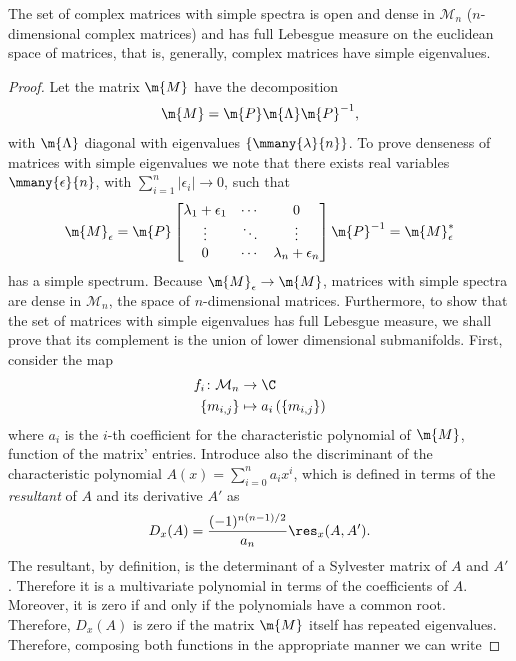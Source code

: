 \begin{proposicao} \label{Prop: simple}
	The set of complex matrices with simple spectra is open and dense in $\mathcal{M}_n$ ($n$-dimensional complex matrices) and has full Lebesgue measure on the euclidean space of matrices, that is, generally, complex matrices have simple eigenvalues.
\end{proposicao}
\begin{proof}
	Let the matrix $\m{M}$ have the decomposition
	\begin{equation}
		\m{M} = \m{P} \m{\Lambda} \m{P}^{-1},
	\end{equation}
	with $\m{\Lambda}$ diagonal with eigenvalues $\{\mmany{\lambda}{n}\}$. To prove denseness of matrices with simple eigenvalues we note that there exists real variables $\mmany{\epsilon}{n}$, with $\sum_{i=1}^n |\epsilon_i| \rightarrow 0$, such that 
	\begin{equation}
		\m{M}_\epsilon = \m{P}
		\begin{bmatrix}
			\lambda_1 + \epsilon_1 & \cdots & 0 \\
			\vdots & \ddots & \vdots \\
			0 & \cdots & \lambda_n + \epsilon_n \\
		\end{bmatrix}
		\m{P}^{-1} = \m{M}^*_\epsilon
	\end{equation}
	has a simple spectrum. Because $\m{M}_\epsilon \rightarrow \m{M}$, matrices with simple spectra are dense in $\mathcal{M}_n$, the space of $n$-dimensional matrices. Furthermore, to show that the set of matrices with simple eigenvalues has full Lebesgue measure, we shall prove that its complement is the union of lower dimensional submanifolds. First, consider the map
	\begin{align}
		f_i \colon  \mathcal{M}_n & \rightarrow \C \\
		\left\{ m_{i,j} \right\} & \mapsto a_i\left(\left\{ m_{i,j} \right\}\right)
	\end{align}
	where $a_i$ is the $i$-th coefficient for the characteristic polynomial of $\m{M}$, function of the matrix' entries. Introduce also the discriminant of the characteristic polynomial $A(x) = \sum_{i=0}^n a_i x^i$, which is defined in terms of the \textit{resultant} of $A$ and its derivative $A'$ as
	\begin{equation}
		D_x(A) = \frac{(-1)^{n(n-1)/2}}{a_n} \res_x(A, A').
	\end{equation}
	The resultant, by definition, is the determinant of a Sylvester matrix of $A$ and $A'$. Therefore it is a multivariate polynomial in terms of the coefficients of $A$. Moreover, it is zero if and only if the polynomials have a common root. Therefore, $D_x(A)$ is zero if the matrix $\m{M}$ itself has repeated eigenvalues. Therefore, composing both functions in the appropriate manner we can write

\end{proof}

